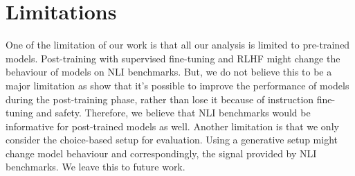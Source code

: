 \section{Limitations}

One of the limitation of our work is that all our analysis is limited to pre-trained models. Post-training with supervised fine-tuning and RLHF might change the behaviour of models on NLI benchmarks. But, we do not believe this to be a major limitation as \citet{dubey2024llama} show that it's possible to improve the performance of models during the post-training phase, rather than lose it because of instruction fine-tuning and safety. Therefore, we believe that NLI benchmarks would be informative for post-trained models as well.
Another limitation is that we only consider the choice-based setup for evaluation. Using a generative setup might change model behaviour and correspondingly, the signal provided by NLI benchmarks. We leave this to future work.